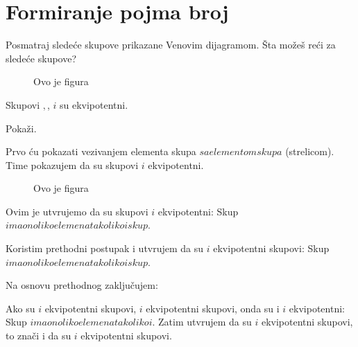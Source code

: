     \section{Formiranje pojma broj}

    \begin{zad}

        Posmatraj slede\' ce skupove prikazane Venovim dijagramom. \v Sta mo\v ze\v s re\' ci za slede\' ce skupove?

    \end{zad}

       \begin{figure}[h]

          \center


         \caption{Ovo je figura}

        \end{figure} 

     Skupovi $, $, $ i $ su ekvipotentni.



     

     Poka\v zi.



     Prvo \' cu pokazati vezivanjem elementa skupa $ sa elementom skupa $ (strelicom). Time pokazujem da su skupovi $ i $ ekvipotentni.

      \begin{figure}[h]

          \center


         \caption{Ovo je figura}\label{slika1str29}

     \end{figure} 



     Ovim je utvr\dj ujemo da su skupovi $ i $ ekvipotentni: Skup $ ima onoliko elemenata koliko i skup $.



     Koristim prethodni postupak i utvr\dj ujem da su $ i $ ekvipotentni skupovi: Skup $ ima onoliko elemenata koliko i skup $.



     Na osnovu prethodnog zaklju\v cujem:



     Ako su $ i $ ekvipotentni skupovi, $ i $ ekvipotentni skupovi, onda su i $ i $ ekvipotentni: Skup $ ima onoliko elemenata koliko i $. Zatim utvr\dj ujem da su $ i $ ekvipotentni skupovi, to zna\v ci i da su $ i $ ekvipotentni skupovi.



